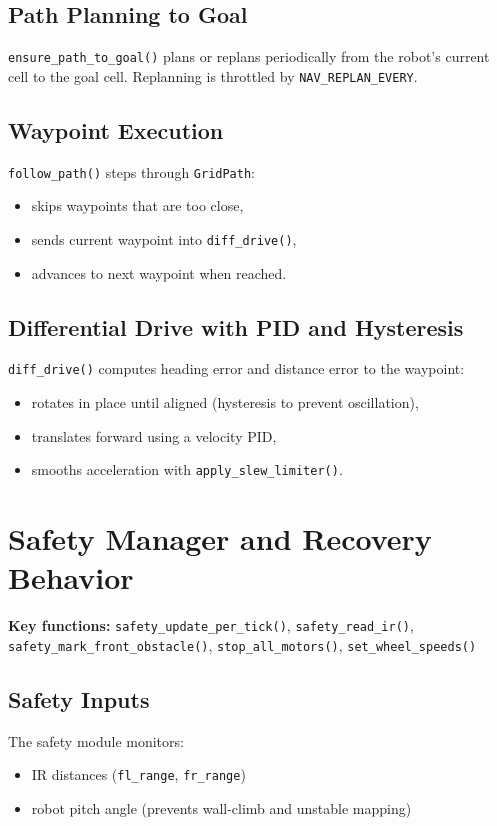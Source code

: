 \documentclass[12pt,a4paper]{article}
\begin{document}
\subsection{Path Planning to Goal}
\texttt{ensure\_path\_to\_goal()} plans or replans periodically from the robot's current cell to the goal cell. Replanning is throttled by \texttt{NAV\_REPLAN\_EVERY}.

\subsection{Waypoint Execution}
\texttt{follow\_path()} steps through \texttt{GridPath}:
\begin{itemize}[leftmargin=2em]
  \item skips waypoints that are too close,
  \item sends current waypoint into \texttt{diff\_drive()},
  \item advances to next waypoint when reached.
\end{itemize}

\subsection{Differential Drive with PID and Hysteresis}
\texttt{diff\_drive()} computes heading error and distance error to the waypoint:
\begin{itemize}[leftmargin=2em]
  \item rotates in place until aligned (hysteresis to prevent oscillation),
  \item translates forward using a velocity PID,
  \item smooths acceleration with \texttt{apply\_slew\_limiter()}.
\end{itemize}

\section{Safety Manager and Recovery Behavior}
\textbf{Key functions:} \texttt{safety\_update\_per\_tick()}, \texttt{safety\_read\_ir()},
\texttt{safety\_mark\_front\_obstacle()}, \texttt{stop\_all\_motors()}, \texttt{set\_wheel\_speeds()}

\subsection{Safety Inputs}
The safety module monitors:
\begin{itemize}[leftmargin=2em]
  \item IR distances (\texttt{fl\_range}, \texttt{fr\_range})
  \item robot pitch angle (prevents wall-climb and unstable mapping)
\end{itemize}
\end{document}
